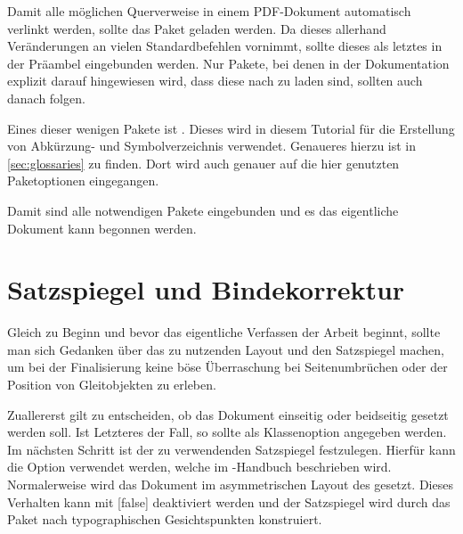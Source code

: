 \documentclass[english,ngerman]{tudscrartcl}
\begin{document}
%
\begin{Tutorial*}
\usepackage{tabu}
\end{Tutorial*}
%
Damit alle möglichen Querverweise in einem PDF-Dokument automatisch verlinkt 
werden, sollte das Paket  geladen werden. Da dieses allerhand 
Veränderungen an vielen Standardbefehlen vornimmt, sollte dieses als letztes in 
der Präambel eingebunden werden. Nur Pakete, bei denen in der Dokumentation 
explizit darauf hingewiesen wird, dass diese nach  zu laden 
sind, sollten auch danach folgen.
%
\begin{Tutorial*}
\usepackage{hyperref}
\end{Tutorial*}
%
Eines dieser wenigen Pakete ist . Dieses wird in diesem 
Tutorial für die Erstellung von Abkürzung- und Symbolverzeichnis verwendet. 
Genaueres hierzu ist in \autoref{sec:glossaries} zu finden. Dort wird auch 
genauer auf die hier genutzten Paketoptionen eingegangen.
%
\begin{Tutorial*}
\usepackage[%
  automake,%
  acronym,%
  symbols,%
  nomain,%
  translate=babel,%
  nogroupskip,%
]{glossaries}
\makeglossaries
\end{Tutorial*}
%
Damit sind alle notwendigen Pakete eingebunden und es das eigentliche Dokument 
kann begonnen werden.
\begin{Tutorial*}
\begin{document}
\end{Tutorial*}



\section{Satzspiegel und Bindekorrektur}
Gleich zu Beginn und bevor das eigentliche Verfassen der Arbeit beginnt, sollte 
man sich Gedanken über das zu nutzenden Layout und den Satzspiegel machen, um 
bei der Finalisierung keine böse Überraschung bei Seitenumbrüchen oder der 
Position von Gleitobjekten zu erleben.

Zuallererst gilt zu entscheiden, ob das Dokument einseitig oder beidseitig 
gesetzt werden soll. Ist Letzteres der Fall, so sollte  als 
Klassenoption angegeben werden. Im nächsten Schritt ist der zu verwendenden 
Satzspiegel festzulegen. Hierfür kann die Option  verwendet 
werden, welche im \TUDScript-Handbuch beschrieben wird. Normalerweise wird das 
Dokument im asymmetrischen Layout des \CDs gesetzt. Dieses Verhalten kann mit 
[false] deaktiviert werden und der Satzspiegel wird durch das 
Paket  nach typographischen Gesichtspunkten konstruiert.
\end{document}
